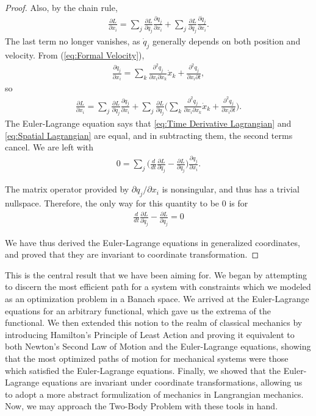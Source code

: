 \documentclass[10.5pt, psamsfonts]{amsart}
\theoremstyle{definition}
\theoremstyle{remark}
\numberwithin{equation}{section}
\begin{document}
\begin{proof}
Also, by the chain rule, 
\begin{align*}
  \frac{\partial L}{\partial x_i}  = \sum_j \frac{\partial L}{\partial q_j} \frac{\partial q_j}{\partial x_i} + \sum_j \frac{\partial L}{\partial \dot{q}_j} \frac{\partial \dot{q}_j}{\partial x_i}.
\end{align*}
The last term no longer vanishes, as $\dot{q}_j$ generally depends on both position and velocity. From (\ref{eq:Formal Velocity}), 
\begin{gather*}
  \frac{\partial \dot{q}_j}{\partial x_i} = \sum_k \frac{\partial^2 q_j}{\partial x_i \partial x_k} \dot{x}_k + \frac{\partial^2 q_j}{\partial x_i \partial t},
\end{gather*}
so
\begin{gather}
\label{eq:Spatial Lagrangian}
  \frac{\partial L}{\partial x_i} = \sum_j \frac{\partial L}{\partial q_j} \frac{\partial q_j}{\partial x_i} + \sum_j \frac{\partial L}{\partial \dot{q}_j}\bigg(\sum_k \frac{\partial^2 q_j}{\partial x_i \partial x_k} \dot{x}_k + \frac{\partial^2 q_j}{\partial x_i \partial t}  \bigg).
\end{gather}
The Euler-Lagrange equation says that \ref{eq:Time Derivative Lagrangian} and \ref{eq:Spatial Lagrangian} are equal, and in subtracting them, the second terms cancel. We are left with
\begin{align*}
  0 = \sum_j \bigg(\frac{d}{dt} \frac{\partial L}{\partial \dot{q}_j} - \frac{\partial L}{\partial q_j} \bigg) \frac{\partial q_j}{\partial x_i} .
\end{align*}

The matrix operator provided by $\partial q_j/\partial x_i $ is nonsingular, and thus has a trivial nullspace. Therefore, the only way for this quantity to be 0 is for
\begin{align*}
  \frac{d}{dt} \frac{\partial L}{\partial \dot{q}_j} - \frac{\partial L}{\partial q_j} = 0
\end{align*}

We have thus derived the Euler-Lagrange equations in generalized coordinates, and proved that they are invariant to coordinate transformation.
\end{proof}

This is the central result that we have been aiming for. We began by attempting to discern the most efficient path for a system with constraints which we modeled as an optimization problem in a Banach space. We arrived at the Euler-Lagrange equations for an arbitrary functional, which gave us the extrema of the functional. We then extended this notion to the realm of classical mechanics by introducing Hamilton's Principle of Least Action and proving it equivalent to both Newton's Second Law of Motion and the Euler-Lagrange equations, showing that the most optimized paths of motion for mechanical systems were those which satisfied the Euler-Lagrange equations. Finally, we showed that the Euler-Lagrange equations are invariant under coordinate transformations, allowing us to adopt a more abstract formulization of mechanics in Langrangian mechanics. Now, we may approach the Two-Body Problem with these tools in hand.
\end{document}
